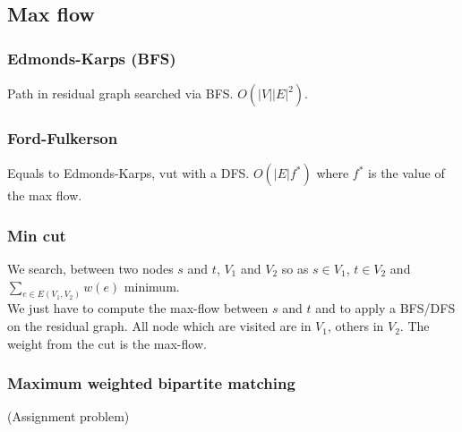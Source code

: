 \subsection{Max flow}
\subsubsection{Edmonds-Karps (BFS)}
Path in residual graph searched via BFS. $O(|V||E|^2)$.\\

\subsubsection{Ford-Fulkerson}
Equals to Edmonds-Karps, vut with a DFS. $O(|E|f^*)$ where $f^*$ is the value of the max flow.

\subsubsection{Min cut}
We search, between two nodes $s$ and $t$, $V_1$ and $V_2$ so as $s\in V_1$, $t\in V_2$ and $\sum_{e \in E(V_1, V_2)} w(e)$ minimum.\\
We just have to compute the max-flow between $s$ and $t$ and to apply a BFS/DFS on the residual graph. All node which are visited are in $V_1$, others in $V_2$. The weight from the cut is the max-flow.
\subsubsection{Maximum weighted bipartite matching}
(Assignment problem)
